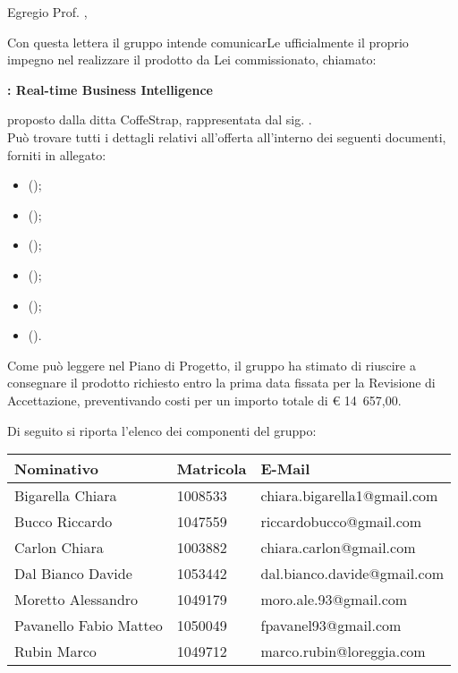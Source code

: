 \documentclass{letter}
\date{}
\begin{document}
\begin{letter}{}

	\vspace{4cm}
	
	\opening{Egregio Prof. \committente{},}
	
	Con questa lettera il gruppo \groupname{} intende comunicarLe ufficialmente il proprio impegno nel realizzare il prodotto da Lei commissionato, chiamato:
	\begin{center}
		\textbf{\projectname{}: Real-time Business Intelligence}
	\end{center}
	proposto dalla ditta CoffeStrap, rappresentata dal sig. \proponente{}.\\
	Può trovare tutti i dettagli relativi all'offerta all'interno dei seguenti documenti, forniti in allegato:

	\begin{itemize}
		\item {} ();
		\item {} ();
		\item {} ();
		\item {} ();
		\item {} ();
		\item {} ().
	\end{itemize}
	Come può leggere nel Piano di Progetto, il gruppo ha stimato di riuscire a consegnare il prodotto richiesto entro la prima data fissata per la Revisione di Accettazione, preventivando costi per un importo totale di \euro{} 14~657,00.

	Di seguito si riporta l'elenco dei componenti del gruppo:
	\begin{center}
		\begin{tabu}{|p{4cm}|p{2.5cm}|p{5cm}|}
		\hline
			\rowfont{\bf}
			\textbf{Nominativo} & \textbf{Matricola} & \textbf{E-Mail} \\ \hline
			Bigarella Chiara & 1008533 & chiara.bigarella1@gmail.com \\ \hline
			Bucco Riccardo & 1047559 & riccardobucco@gmail.com \\ \hline
			Carlon Chiara & 1003882 & chiara.carlon@gmail.com \\ \hline
			Dal Bianco Davide & 1053442 & dal.bianco.davide@gmail.com \\ \hline
			Moretto Alessandro & 1049179 & moro.ale.93@gmail.com \\ \hline
			Pavanello Fabio Matteo & 1050049 & fpavanel93@gmail.com \\ \hline
			Rubin Marco & 1049712 & marco.rubin@loreggia.com \\ \hline
		\end{tabu}
	\end{center}


\end{letter}
\end{document}
